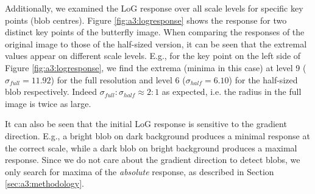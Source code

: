 Additionally, we examined the LoG response over all scale levels for specific key points (blob centres). Figure \ref{fig:a3:logresponse} shows the response for two distinct key points of the butterfly image. When comparing the responses of the original image to those of the half-sized version, it can be seen that the extremal values appear on different scale levels. E.g., for the key point on the left side of Figure \ref{fig:a3:logresponse}, we find the extrema (minima in this case) at level 9 ($\sigma_{full}=11.92$) for the full resolution and level 6 ($\sigma_{half}=6.10$) for the half-sized blob respectively. Indeed $\sigma_{full} : \sigma_{half} \approx 2:1$ as expected, i.e. the radius in the full image is twice as large.

It can also be seen that the initial LoG response is sensitive to the gradient direction. E.g., a bright blob on dark background produces a minimal response at the correct scale, while a dark blob on bright background produces a maximal response. Since we do not care about the gradient direction to detect blobs, we only search for maxima of the \textit{absolute} response, as described in Section \ref{sec:a3:methodology}.

